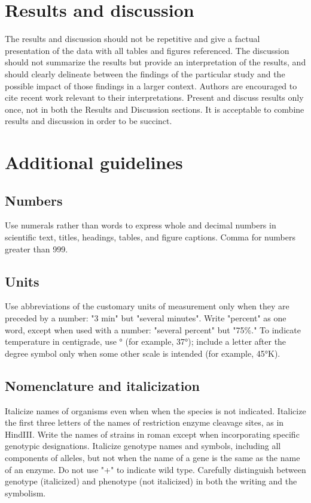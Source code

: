 \documentclass[9pt,twocolumn,twoside,lineno]{gsag3jnl}
\begin{document}
\section{Results and discussion}

The results and discussion should not be repetitive and give a factual presentation of the data with all tables and figures referenced. The discussion should not summarize the results but provide an interpretation of the results, and should clearly delineate between the findings of the particular study and the possible impact of those findings in a larger context. Authors are encouraged to cite recent work relevant to their interpretations. Present and discuss results only once, not in both the Results and Discussion sections. It is acceptable to combine results and discussion in order to be succinct.

\section{Additional guidelines}

\subsection{Numbers} Use numerals rather than words to express whole and decimal numbers in scientific text, titles, headings, tables, and figure captions. Comma for numbers greater than 999.

\subsection{Units} Use abbreviations of the customary units of measurement only when they are preceded by a number: "3 min" but "several minutes". Write "percent" as one word, except when used with a number: "several percent" but "75\%." To indicate temperature in centigrade, use ° (for example, 37°); include a letter after the degree symbol only when some other scale is intended (for example, 45°K).

\subsection{Nomenclature and italicization} Italicize names of organisms even when  when the species is not indicated.  Italicize the first three letters of the names of restriction enzyme cleavage sites, as in HindIII. Write the names of strains in roman except when incorporating specific genotypic designations. Italicize genotype names and symbols, including all components of alleles, but not when the name of a gene is the same as the name of an enzyme. Do not use "+" to indicate wild type. Carefully distinguish between genotype (italicized) and phenotype (not italicized) in both the writing and the symbolism.
\end{document}
